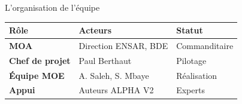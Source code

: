\documentclass[10pt,aspectratio=169]{beamer}
\begin{document}
\begin{frame}[shrink=10]{L'organisation de l'équipe}
    \vspace{0.3cm}
    \begin{center}
        \renewcommand{\arraystretch}{1.2}
        \begin{tabular}{lll}
            \textbf{\normalsize\color{ensarorange} Rôle} &
            \textbf{\normalsize\color{ensarorange} Acteurs} &
            \textbf{\normalsize\color{ensarorange} Statut} \\
            \midrule
            \textbf{\small MOA} & \small Direction ENSAR, BDE & \small Commanditaire \\
            \textbf{\small Chef de projet} & \small Paul Berthaut & \small Pilotage \\
            \textbf{\small Équipe MOE} & \small A. Saleh, S. Mbaye & \small Réalisation \\
            \textbf{\small Appui} & \small Auteurs ALPHA V2 & \small Experts \\
            \bottomrule
        \end{tabular}
    \end{center}
\end{frame}
\end{document}
